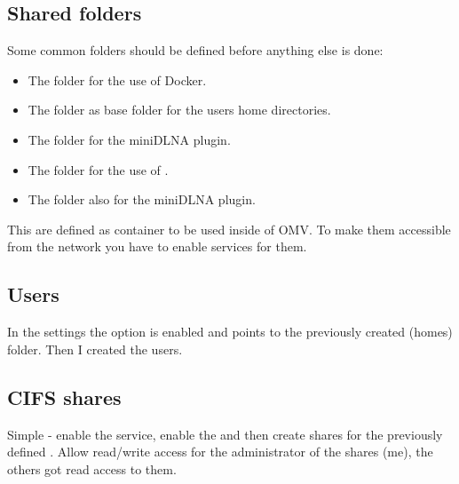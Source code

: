 \subsection{Shared folders}\label{subsec:Shared folders}

Some common folders should be defined before anything else is done:

\begin{itemize}
    \item The folder  for the use of \gls{Docker}.
    \item The folder  as base folder for the users home directories.
    \item The folder  for the miniDLNA plugin.
    \item The folder  for the use of .
    \item The folder  also for the miniDLNA plugin.
\end{itemize}


This  are defined as container to be used inside
of \gls{OMV}. To make them accessible from the network you have to enable
services for them.

\subsection{Users}

In the settings the option  is enabled and
points to the previously created \tsFontCode(homes) folder. Then I created
the users.


\subsection{CIFS shares}

Simple - enable the  service, enable the  and then create shares for the previously defined . Allow read/write access for the administrator of the shares (me),
the others got read access to them.


